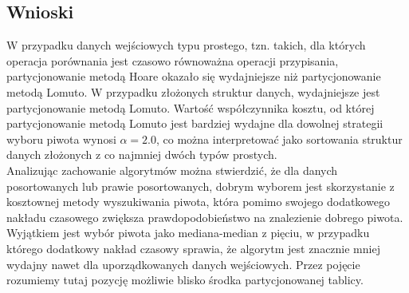 \begin{figure}[]
	\centering
	
	\caption[]{}
	\label{fig:quick-sort-deterministic-pivot-all}
\end{figure}

\subsection{Wnioski}
W przypadku danych wejściowych typu prostego, tzn. takich, dla których operacja porównania jest czasowo równoważna operacji przypisania, partycjonowanie metodą Hoare okazało się wydajniejsze niż partycjonowanie metodą Lomuto. W przypadku złożonych struktur danych, wydajniejsze jest partycjonowanie metodą Lomuto. Wartość współczynnika kosztu, od której partycjonowanie metodą Lomuto jest bardziej wydajne dla dowolnej strategii wyboru piwota wynosi $\alpha = 2.0$, co można interpretować jako sortowania struktur danych złożonych z co najmniej dwóch typów prostych.\\

Analizując zachowanie algorytmów można stwierdzić, że dla danych posortowanych lub prawie posortowanych, dobrym wyborem jest skorzystanie z kosztownej metody wyszukiwania piwota, która pomimo swojego dodatkowego nakładu czasowego zwiększa prawdopodobieństwo na znalezienie dobrego piwota. Wyjątkiem jest wybór piwota jako mediana-median z pięciu, w przypadku którego dodatkowy nakład czasowy sprawia, że algorytm jest znacznie mniej wydajny nawet dla uporządkowanych danych wejściowych. Przez pojęcie  rozumiemy tutaj pozycję możliwie blisko środka partycjonowanej tablicy.\\
